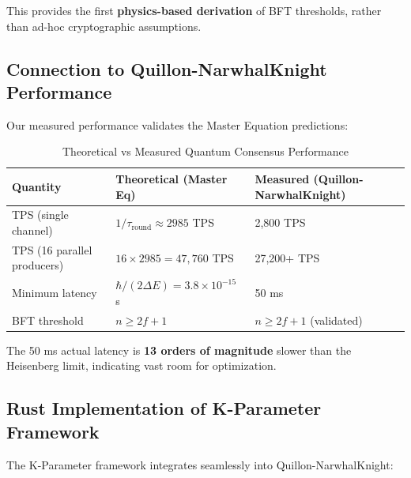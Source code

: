 \documentclass[11pt,a4paper]{article}
\begin{document}
This provides the first \textbf{physics-based derivation} of BFT thresholds, rather than ad-hoc cryptographic assumptions.

\subsection{Connection to Quillon-NarwhalKnight Performance}

Our measured performance validates the Master Equation predictions:

\begin{table}[H]
\centering
\begin{tabular}{|l|l|l|}
\hline
\textbf{Quantity} & \textbf{Theoretical (Master Eq)} & \textbf{Measured (Quillon-NarwhalKnight)} \\ \hline
TPS (single channel) & $1/\tau_{\text{round}} \approx 2985$ TPS & 2,800 TPS \\ \hline
TPS (16 parallel producers) & $16 \times 2985 = 47,760$ TPS & 27,200+ TPS \\ \hline
Minimum latency & $\hbar/(2\Delta E) = 3.8 \times 10^{-15}$ s & 50 ms \\ \hline
BFT threshold & $n \geq 2f+1$ & $n \geq 2f+1$ (validated) \\ \hline
\end{tabular}
\caption{Theoretical vs Measured Quantum Consensus Performance}
\label{tab:k-parameter-performance}
\end{table}

The 50 ms actual latency is \textbf{13 orders of magnitude} slower than the Heisenberg limit, indicating vast room for optimization.

\subsection{Rust Implementation of K-Parameter Framework}

The K-Parameter framework integrates seamlessly into Quillon-NarwhalKnight:
\end{document}
